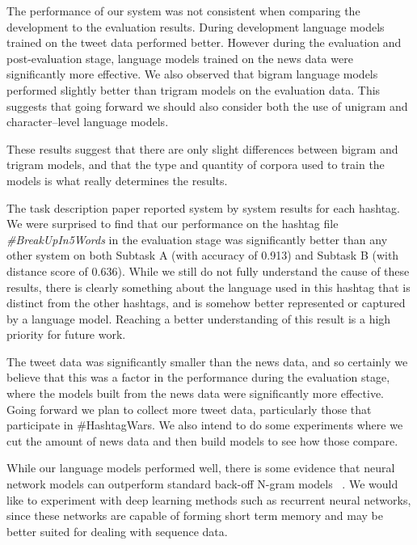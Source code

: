 \documentclass[11pt,a4paper]{article}
\begin{document}
The performance of our system was not consistent when
comparing the development to the evaluation results.
During development language models trained on the
tweet data performed better.
However during the evaluation and post-evaluation stage, 
language models trained on the news data were 
significantly more effective. We also observed that
bigram language models performed slightly better than
trigram models on the evaluation data. This suggests
that going forward we should also consider both the use of
unigram and character--level language models. 

These results suggest that there are only 
slight differences between bigram and trigram models,
and that the type and quantity of corpora used to train the 
models is what really determines the results. 

The task description paper \cite{PotashRR17} 
reported system by system results for each hashtag. 
We were surprised to find that our 
performance on the hashtag file 
\textit{\#BreakUpIn5Words} in the evaluation 
stage was significantly 
better than any other  system on both Subtask A 
(with accuracy of 0.913) and Subtask B 
(with distance score of 0.636). While we still do not 
fully understand the cause of these results, there is clearly
something about the language used in this hashtag that
is distinct from the other hashtags, and is somehow better
represented or captured by a language model. Reaching a better
understanding of this  result is a high priority for future work. 

The tweet data was significantly smaller than the news data, and
so certainly we believe that this was a factor in the performance
during the evaluation stage, where the models built from the news
data were significantly more effective. Going forward we plan to
collect more tweet data, particularly those that participate in 
\#HashtagWars. We also intend to do some experiments where we 
cut the amount of news data and then build models to see how 
those compare. 

While our language models performed well, there
is some evidence that neural network models
can outperform 
standard back-off N-gram models ~\cite{mikolov2011extensions}. 
We would like to experiment with deep learning methods such 
as recurrent neural networks, since 
these networks are capable of 
forming short term memory and may be better suited for dealing 
with sequence data. 

\end{document}
